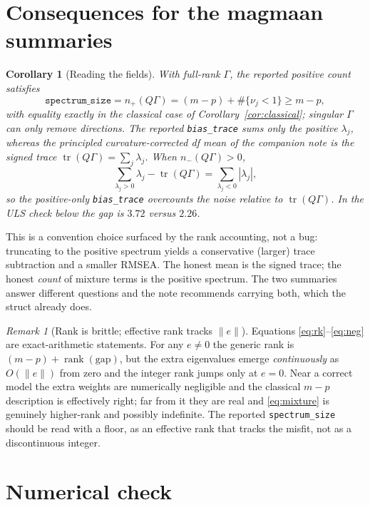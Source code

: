 \documentclass[11pt]{article}
\newcommand{\tr}{\operatorname{tr}}
\newcommand{\rank}{\operatorname{rank}}
\newcommand{\np}{n_{+}}
\newcommand{\nm}{n_{-}}
\theoremstyle{plain}
\newtheorem{corollary}{Corollary}
\theoremstyle{remark}
\newtheorem*{remark}{Remark}
\begin{document}
\section{Consequences for the magmaan summaries}\label{sec:magmaan}

\begin{corollary}[Reading the fields]\label{cor:magmaan}
With full-rank $\Gamma$, the reported positive count satisfies
\[
  \texttt{spectrum\_size}=\np(Q\Gamma)=(m-p)+\#\{\nu_j<1\}\ge m-p,
\]
with equality exactly in the classical case of Corollary~\ref{cor:classical};
singular $\Gamma$ can only remove directions. The reported
\texttt{bias\_trace} sums only the positive $\lambda_j$, whereas the principled
curvature-corrected df mean of the companion note is the \emph{signed} trace
$\tr(Q\Gamma)=\sum_j\lambda_j$. When $\nm(Q\Gamma)>0$,
\[
  \sum_{\lambda_j>0}\lambda_j-\tr(Q\Gamma)
  =\sum_{\lambda_j<0}|\lambda_j|,
\]
so the positive-only \texttt{bias\_trace} \emph{overcounts} the noise relative
to $\tr(Q\Gamma)$. In the ULS check below the gap is $3.72$ versus $2.26$.
\end{corollary}

This is a convention choice surfaced by the rank accounting, not a bug:
truncating to the positive spectrum yields a conservative (larger) trace
subtraction and a smaller RMSEA. The honest mean is the signed trace; the honest
\emph{count} of mixture terms is the positive spectrum. The two summaries answer
different questions and the note recommends carrying both, which the struct
already does.

\begin{remark}[Rank is brittle; effective rank tracks $\lVert e\rVert$]
Equations \eqref{eq:rk}--\eqref{eq:neg} are exact-arithmetic statements. For any
$e\neq0$ the generic rank is $(m-p)+\rank(\text{gap})$, but the extra
eigenvalues emerge \emph{continuously} as $O(\lVert e\rVert)$ from zero and the
integer rank jumps only at $e=0$. Near a correct model the extra weights are
numerically negligible and the classical $m-p$ description is effectively right;
far from it they are real and \eqref{eq:mixture} is genuinely higher-rank and
possibly indefinite. The reported \texttt{spectrum\_size} should be read with a
floor, as an effective rank that tracks the misfit, not as a discontinuous
integer.
\end{remark}

\section{Numerical check}\label{sec:check}
\end{document}
